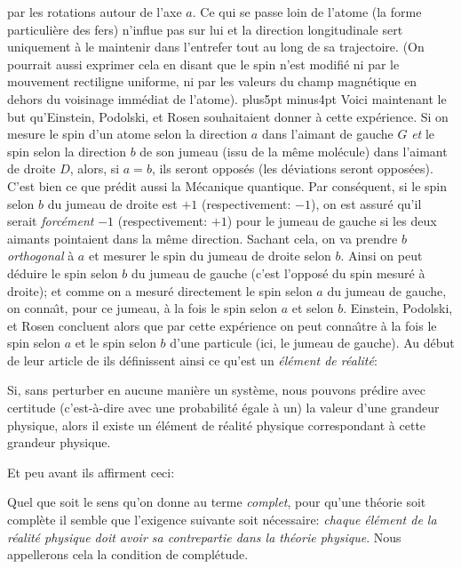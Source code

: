 par les rotations autour de l'axe $a$. Ce qui se passe loin de l'atome 
(la forme particuli\`ere des fers) n'influe pas sur lui et la direction 
longitudinale sert uniquement \`a le maintenir dans l'entrefer tout au  
long de sa trajectoire. (On pourrait aussi exprimer cela en disant que le 
spin n'est modifi\'e ni par le mouvement rectiligne uniforme, ni par les 
valeurs du champ magn\'etique en dehors du voisinage imm\'ediat de 
l'atome).  
\vskip6pt plus5pt minus4pt 
Voici maintenant le but qu'Einstein, Podolski, et Rosen souhaitaient 
donner \`a cette exp\'erience. Si on mesure le spin d'un atome 
selon la direction $a$ dans l'aimant de gauche $G$ {\it et} le spin 
selon la direction $b$ de son jumeau (issu de la m\^eme 
mol\'ecule)  dans l'aimant de droite $D$, alors, si $a = b$, ils seront 
oppos\'es (les d\'eviations seront oppos\'ees). C'est bien ce que pr\'edit 
aussi la M\'ecanique quantique.  Par cons\'equent, si le spin selon $b$ du 
jumeau de droite est $+1$ (respectivement: $-1$), on est assur\'e qu'il
serait {\it forc\'ement} $-1$ (respectivement: $+1$) pour le jumeau de gauche
si les deux aimants pointaient dans la m\^eme direction. 
Sachant cela, on va prendre $b$ {\it orthogonal} \`a $a$ et mesurer le spin
du jumeau de droite selon $b$. Ainsi on peut d\'eduire le spin selon $b$ du
jumeau de gauche (c'est l'oppos\'e du spin mesur\'e \`a droite);  et comme
on a mesur\'e directement le spin selon $a$ du jumeau de gauche,  on
conna{\^\i}t,  pour ce jumeau,  \`a la fois le spin selon $a$ et selon $b$. 
Einstein,  Podolski,  et Rosen concluent alors que par cette exp\'erience
on peut conna{\^\i}tre \`a la fois le spin selon $a$ et le spin selon $b$
d'une particule (ici,  le jumeau de gauche).  
\medskip
Au d\'ebut de leur article de {} ils d\'efinissent ainsi
ce qu'est un {\it \'el\'ement de r\'ealit\'e}:
\smallskip
{\cit Si,  sans perturber en aucune mani\`ere un syst\`eme, 
nous pouvons pr\'edire avec certitude (c'est-\`a-dire avec une
probabilit\'e \'egale \`a un) la valeur d'une grandeur physique, 
alors il existe un \'el\'ement de r\'ealit\'e physique correspondant
\`a cette grandeur physique. \par}
\medskip
Et peu avant ils affirment ceci:
\smallskip
{\cit Quel que soit le sens qu'on donne au terme {\it complet}, 
pour qu'une th\'eorie soit compl\`ete il semble que l'exigence
suivante soit n\'ecessaire: {\it chaque \'el\'ement de la r\'ealit\'e
physique doit avoir sa contrepartie dans la th\'eorie physique}. 
Nous appellerons cela la condition de compl\'etude. \par}

